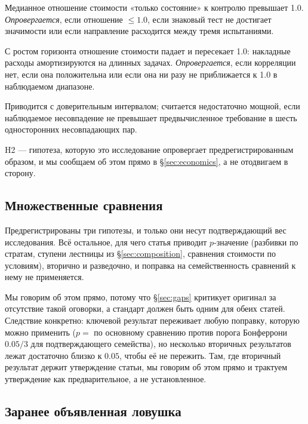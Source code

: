 \begin{description}[style=nextline]
\item[H1 (стоимость).] Медианное отношение стоимости «только состояние» к
  контролю превышает 1.0. \emph{Опровергается}, если отношение $\le 1.0$,
  если знаковый тест не достигает значимости или если направление
  расходится между тремя испытаниями.
\item[H2 (горизонт).] С ростом горизонта отношение стоимости падает и
  пересекает 1.0: накладные расходы амортизируются на длинных задачах.
  \emph{Опровергается}, если корреляции нет, если она положительна или если
  она ни разу не приближается к 1.0 в наблюдаемом диапазоне.
\item[H3 (способность).] Приводится с доверительным интервалом; считается
  недостаточно мощной, если наблюдаемое несовпадение не превышает
  предвычисленное требование в шесть односторонних несовпадающих пар.
\end{description}

H2 — гипотеза, которую это исследование опровергает предрегистрированным
образом, и мы сообщаем об этом прямо в \S\ref{sec:economics}, а не отодвигаем
в сторону.

\subsection{Множественные сравнения}

Предрегистрированы три гипотезы, и только они несут подтверждающий вес
исследования. Всё остальное, для чего статья приводит $p$-значение
(разбивки по стратам, ступени лестницы из \S\ref{sec:composition},
сравнения стоимости по условиям), вторично и разведочно, и поправка на
семейственность сравнений к нему не применяется.

Мы говорим об этом прямо, потому что \S\ref{sec:gaps} критикует оригинал за
отсутствие такой оговорки, а стандарт должен быть одним для обеих статей.
Следствие конкретно: ключевой результат переживает любую поправку, которую
можно применить ($p={}$\McnPTailZero{} по основному сравнению против порога
Бонферрони $0.05/3$ для подтверждающего семейства), но несколько вторичных
результатов лежат достаточно близко к $0.05$, чтобы её не пережить. Там, где
вторичный результат держит утверждение статьи, мы говорим об этом прямо и
трактуем утверждение как предварительное, а не установленное.

\subsection{Заранее объявленная ловушка}


